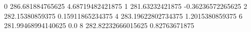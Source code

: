 0 286.681884765625 4.68719482421875
1 281.63232421875 -0.36236572265625
2 282.15380859375 0.15911865234375
4 283.19622802734375 1.2015380859375
6 281.99468994140625 0.0
8 282.82232666015625 0.82763671875
